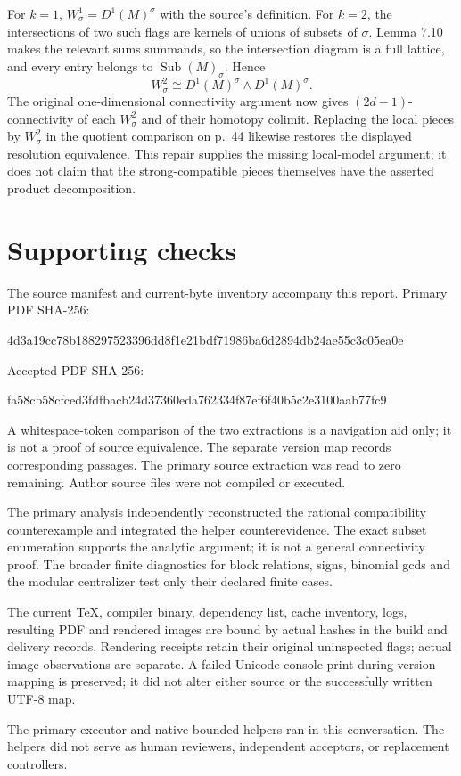 \documentclass[10pt]{article}
\begin{document}
For \(k=1\), \(W^1_\sigma=D^1(M)^\sigma\) with the source’s definition. For \(k=2\), the intersections of two such flags are kernels of unions of subsets of \(\sigma\). Lemma 7.10 makes the relevant sums summands, so the intersection diagram is a full lattice, and every entry belongs to \(\operatorname{Sub}(M)_\sigma\). Hence \[W^2_\sigma\cong
                D^1(M)^\sigma\wedge D^1(M)^\sigma.\] The original one-dimensional connectivity argument now gives \((2d-1)\)-connectivity of each \(W^2_\sigma\) and of their homotopy colimit. Replacing the local pieces by \(W^2_\sigma\) in the quotient comparison on p. 44 likewise restores the displayed resolution equivalence. This repair supplies the missing local-model argument; it does not claim that the strong-compatible pieces themselves have the asserted product decomposition.\par
\section*{Supporting checks}
The source manifest and current-byte inventory accompany this report. Primary PDF SHA-256:\par
4d3a19cc78b188297523396dd8f1e21bdf71986ba6d2894db24ae55c3c05ea0e\par
Accepted PDF SHA-256:\par
fa58cb58cfced3fdfbacb24d37360eda762334f87ef6f40b5c2e3100aab77fc9\par
A whitespace-token comparison of the two extractions is a navigation aid only; it is not a proof of source equivalence. The separate version map records corresponding passages. The primary source extraction was read to zero remaining. Author source files were not compiled or executed.\par
The primary analysis independently reconstructed the rational compatibility counterexample and integrated the helper counterevidence. The exact subset enumeration supports the analytic argument; it is not a general connectivity proof. The broader finite diagnostics for block relations, signs, binomial gcds and the modular centralizer test only their declared finite cases.\par
The current TeX, compiler binary, dependency list, cache inventory, logs, resulting PDF and rendered images are bound by actual hashes in the build and delivery records. Rendering receipts retain their original uninspected flags; actual image observations are separate. A failed Unicode console print during version mapping is preserved; it did not alter either source or the successfully written UTF-8 map.\par
The primary executor and native bounded helpers ran in this conversation. The helpers did not serve as human reviewers, independent acceptors, or replacement controllers.\par
\end{document}

